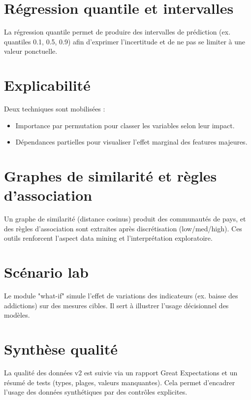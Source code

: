 \section{Régression quantile et intervalles}
La régression quantile permet de produire des intervalles de prédiction (ex. quantiles 0.1, 0.5, 0.9) afin d'exprimer l'incertitude et de ne pas se limiter à une valeur ponctuelle.

\section{Explicabilité}
Deux techniques sont mobilisées :
\begin{itemize}
    \item Importance par permutation pour classer les variables selon leur impact.
    \item Dépendances partielles pour visualiser l'effet marginal des features majeures.
\end{itemize}

\section{Graphes de similarité et règles d'association}
Un graphe de similarité (distance cosinus) produit des communautés de pays, et des règles d'association sont extraites après discrétisation (low/med/high). Ces outils renforcent l'aspect data mining et l'interprétation exploratoire.

\section{Scénario lab}
Le module "what-if" simule l'effet de variations des indicateurs (ex. baisse des addictions) sur des mesures cibles. Il sert à illustrer l'usage décisionnel des modèles.

\section{Synthèse qualité}
La qualité des données v2 est suivie via un rapport Great Expectations et un résumé de tests (types, plages, valeurs manquantes). Cela permet d'encadrer l'usage des données synthétiques par des contrôles explicites.
